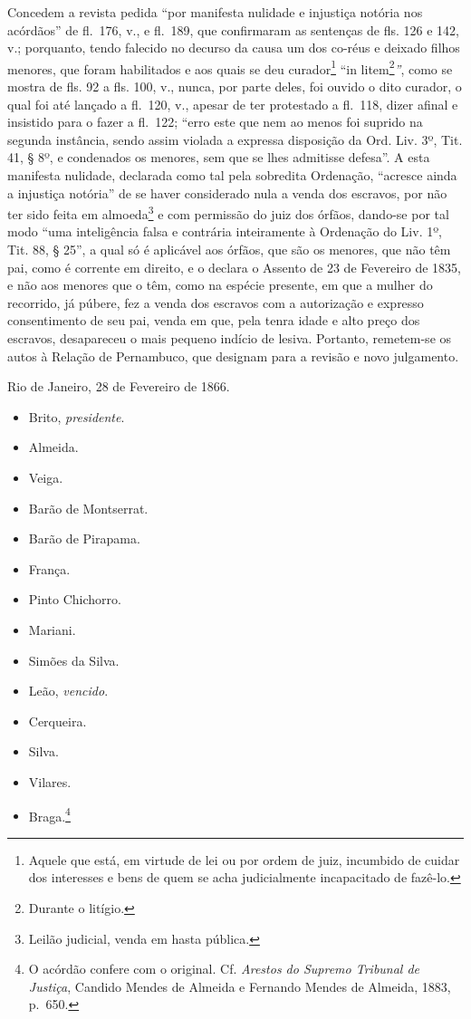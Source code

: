 Concedem a revista pedida ``por manifesta nulidade e injustiça notória
nos acórdãos'' de fl.~176, v., e fl.~189, que confirmaram as sentenças de
fls. 126 e 142, v.; porquanto, tendo falecido no decurso da causa um dos
co-réus e deixado filhos menores, que foram habilitados e aos quais se
deu curador\footnote{Aquele que está, em virtude de lei ou por ordem
  de juiz, incumbido de cuidar dos interesses e bens de quem se acha
  judicialmente incapacitado de fazê-lo.} ``in litem\footnote{Durante o
  litígio.}\emph{''}, como se mostra de fls. 92 a fls. 100, v., nunca,
por parte deles, foi ouvido o dito curador, o qual foi até lançado a
fl.~120, v., apesar de ter protestado a fl.~118, dizer afinal e
insistido para o fazer a fl.~122; ``erro este que nem ao menos foi
suprido na segunda instância, sendo assim violada a expressa disposição
da Ord. Liv. 3º, Tit. 41, § 8º, e condenados os menores, sem que se lhes
admitisse defesa''. A esta manifesta nulidade, declarada como tal pela
sobredita Ordenação, ``acresce ainda a injustiça notória'' de se haver
considerado nula a venda dos escravos, por não ter sido feita em
almoeda\footnote{Leilão judicial, venda em hasta pública.} e com
permissão do juiz dos órfãos, dando-se por tal modo ``uma inteligência
falsa e contrária inteiramente à Ordenação do Liv. 1º, Tit. 88, § 25'', a
qual só é aplicável aos órfãos, que são os menores, que não têm pai,
como é corrente em direito, e o declara o Assento de 23 de Fevereiro de
1835, e não aos menores que o têm, como na espécie presente, em que a
mulher do recorrido, já púbere, fez a venda dos escravos com a
autorização e expresso consentimento de seu pai, venda em que, pela
tenra idade e alto preço dos escravos, desapareceu o mais pequeno
indício de lesiva. Portanto, remetem-se os autos à Relação de
Pernambuco, que designam para a revisão e novo julgamento.

Rio de Janeiro, 28 de Fevereiro de 1866.

\begin{itemize}
\tightlist
\item
  Brito, \emph{presidente}.
\item
  Almeida.
\item
  Veiga.
\item
  Barão de Montserrat.
\item
  Barão de Pirapama.
\item
  França.
\item
  Pinto Chichorro.
\item
  Mariani.
\item
  Simões da Silva.
\item
  Leão, \emph{vencido}.
\item
  Cerqueira.
\item
  Silva.
\item
  Vilares.
\item
  Braga.\footnote{O acórdão confere com o original. Cf. \emph{Arestos
    do Supremo Tribunal de Justiça}, Candido Mendes de Almeida e
    Fernando Mendes de Almeida, 1883, p.~650.}
\end{itemize}

